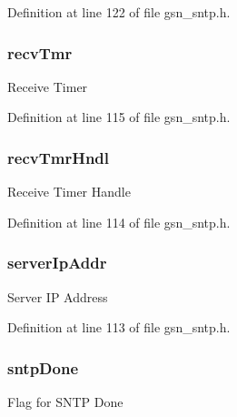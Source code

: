 Definition at line 122 of file gsn\_\-sntp.h.

\hypertarget{a00227_aceccc0d31027efd5c8c774981cb782f3}{
\subsubsection[{recvTmr}]{ {\bf recvTmr}}}
\label{a00227_aceccc0d31027efd5c8c774981cb782f3}
Receive Timer 

Definition at line 115 of file gsn\_\-sntp.h.

\hypertarget{a00227_a99352b33eae768a9ac49ad9cd195a03f}{
\subsubsection[{recvTmrHndl}]{ {\bf recvTmrHndl}}}
\label{a00227_a99352b33eae768a9ac49ad9cd195a03f}
Receive Timer Handle 

Definition at line 114 of file gsn\_\-sntp.h.

\hypertarget{a00227_a09261ac30de0001f89753c8f3869ad2f}{
\subsubsection[{serverIpAddr}]{ {\bf serverIpAddr}}}
\label{a00227_a09261ac30de0001f89753c8f3869ad2f}
Server IP Address 

Definition at line 113 of file gsn\_\-sntp.h.

\hypertarget{a00227_a25ee748bd783b7df54ec68bcade63962}{
\subsubsection[{sntpDone}]{ {\bf sntpDone}}}
\label{a00227_a25ee748bd783b7df54ec68bcade63962}
Flag for SNTP Done 


